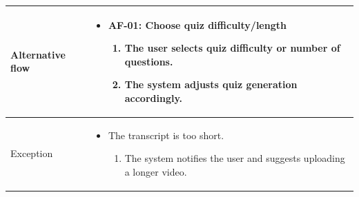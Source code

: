 \begin{table}[H]
    \begin{tabular}{|>{\raggedright\arraybackslash}p{}|>{\raggedright\arraybackslash}p{}|}
        \hline
        Alternative flow &
        \begin{itemize}
            \item AF-01: Choose quiz difficulty/length
            \begin{enumerate}
                \item The user selects quiz difficulty or number of questions.
                \item The system adjusts quiz generation accordingly.
            \end{enumerate}
        \end{itemize} \\
        \hline
        Exception &
        \begin{itemize}
            \item The transcript is too short.
            \begin{enumerate}
                \item The system notifies the user and suggests uploading a longer video.
            \end{enumerate}
        \end{itemize}\\
        \hline
    \end{tabular}
\end{table}

